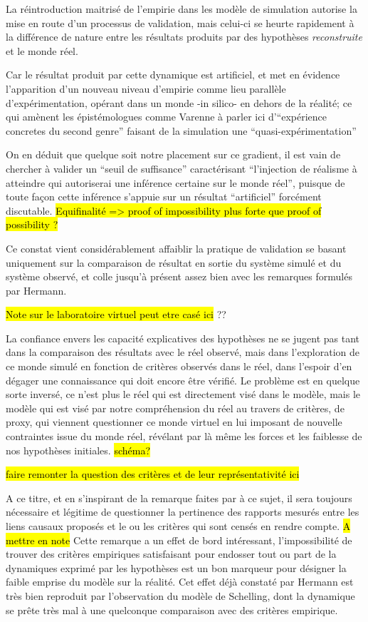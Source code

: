 La réintroduction maitrisé de l'empirie dans les modèle de simulation autorise la mise en route d'un processus de validation, mais celui-ci se heurte rapidement à la différence de nature entre les résultats produits par des hypothèses \textit{reconstruite} et le monde réel. 

Car le résultat produit par cette dynamique est artificiel, et met en évidence l'apparition d'un nouveau niveau d'empirie comme lieu parallèle d'expérimentation, opérant dans un monde -in silico- en dehors de la réalité; ce qui amènent les épistémologues comme Varenne à parler ici d'\enquote{expérience concretes du second genre} faisant de la simulation une \enquote{quasi-expérimentation} \autocites{Varenne2001, Varenne2007, Phan2008 }

On en déduit que quelque soit notre placement sur ce gradient, il est vain de chercher à valider un \enquote{seuil de suffisance} caractérisant \enquote{l'injection de réalisme à atteindre qui autoriserai une inférence certaine sur le monde réel}, puisque de toute façon cette inférence s'appuie sur un résultat \enquote{artificiel} forcément discutable.     \hl{Equifinalité => proof of impossibility plus forte que proof of possibility ?}

Ce constat vient considérablement affaiblir la pratique de validation se basant uniquement sur la comparaison de résultat en sortie du système simulé et du système observé, et colle jusqu'à présent assez bien avec les remarques formulés par Hermann.

\hl{Note sur le laboratoire virtuel peut etre casé ici} ?? 

La confiance envers les capacité explicatives des hypothèses ne se jugent pas tant dans la comparaison des résultats avec le réel observé, mais dans l'exploration de ce monde simulé en fonction de critères observés dans le réel, dans l'espoir d'en dégager une connaissance qui doit encore être vérifié. Le problème est en quelque sorte inversé, ce n'est plus le réel qui est directement visé dans le modèle, mais le modèle qui est visé par notre compréhension du réel au travers de critères, de proxy, qui viennent questionner ce monde virtuel en lui imposant de nouvelle contraintes issue du monde réel, révélant par là même les forces et les faiblesse de nos hypothèses initiales. \hl{schéma?}

\hl{ faire remonter la question des critères et de leur représentativité ici }

A ce titre, et en s'inspirant de la remarque faites par \textcite{Bulle2005} à ce sujet, il sera toujours nécessaire et légitime de questionner la pertinence des rapports mesurés entre les liens causaux proposés et le ou les critères qui sont censés en rendre compte. \hl{A mettre en note} Cette remarque a un effet de bord intéressant, l'impossibilité de trouver des critères empiriques satisfaisant pour endosser tout ou part de la dynamiques exprimé par les hypothèses est un bon marqueur pour désigner la faible emprise du modèle sur la réalité. Cet effet déjà constaté par Hermann est très bien reproduit par l'observation du modèle de Schelling, dont la dynamique se prête très mal à une quelconque comparaison avec des critères empirique.

